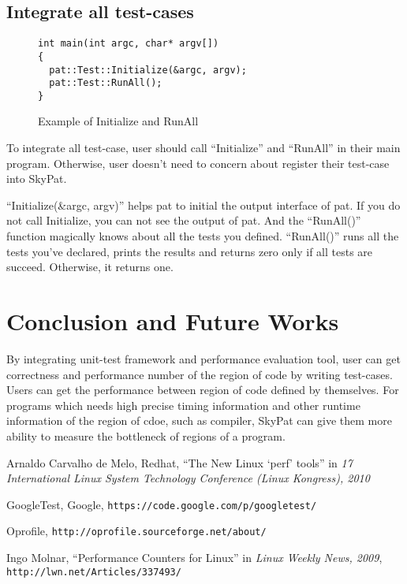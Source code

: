 \documentclass[final]{ols}
\begin{document}
\subsection{Integrate all test-cases}

\begin{figure}[h]
\lstset{language=C++}
\begin{lstlisting}[frame=single]
int main(int argc, char* argv[])
{
  pat::Test::Initialize(&argc, argv);
  pat::Test::RunAll();
}
\end{lstlisting}
\caption{Example of Initialize and RunAll}
\label{main_example}
\end{figure}

To integrate all test-case, user should call ``Initialize'' and ``RunAll'' in their main program.
Otherwise, user doesn't need to concern about register their test-case into SkyPat.

``Initialize(\&argc, argv)'' helps pat to initial the output interface of pat. If you do not call Initialize, you can not see the output of pat.
And the ``RunAll()'' function magically knows about all the tests you defined.
``RunAll()'' runs all the tests you've declared, prints the results and returns zero only if all tests are succeed. Otherwise, it returns one.

\section{Conclusion and Future Works}
By integrating unit-test framework and performance evaluation tool, user can get correctness and performance number of the region of code by writing test-cases.
Users can get the performance between region of code defined by themselves.
For programs which needs high precise timing information and other runtime information of the region of cdoe, such as compiler, SkyPat can give them more ability to measure the bottleneck of regions of a program.

\begin{thebibliography}{99}  %
Arnaldo Carvalho de Melo, Redhat, ``The New Linux `perf' tools'' in \emph{17 International Linux System Technology Conference (Linux Kongress), 2010}

GoogleTest, Google, \texttt{\small https://code.google.com/p/googletest/}

Oprofile, \texttt{\small \newline http://oprofile.sourceforge.net/about/}

Ingo Molnar, ``Performance Counters for Linux'' in \emph{Linux Weekly News, 2009}, \texttt{\small http://lwn.net/Articles/337493/}

\end{thebibliography}
\end{document}
